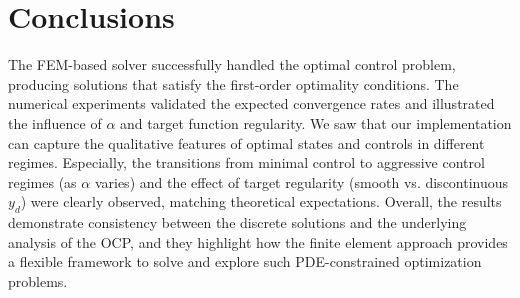 \documentclass{article}
\begin{document}
\section{Conclusions}
The FEM-based solver successfully handled the optimal control problem, producing solutions that satisfy the first-order optimality conditions. The numerical experiments validated the expected convergence rates and illustrated the influence of $\alpha$ and target function regularity. We saw that our implementation can capture the qualitative features of optimal states and controls in different regimes. Especially, the transitions from minimal control to aggressive control regimes (as $\alpha$ varies) and the effect of target regularity (smooth vs. discontinuous $y_d$) were clearly observed, matching theoretical expectations. Overall, the results demonstrate consistency between the discrete solutions and the underlying analysis of the OCP, and they highlight how the finite element approach provides a flexible framework to solve and explore such PDE-constrained optimization problems.
\end{document}

